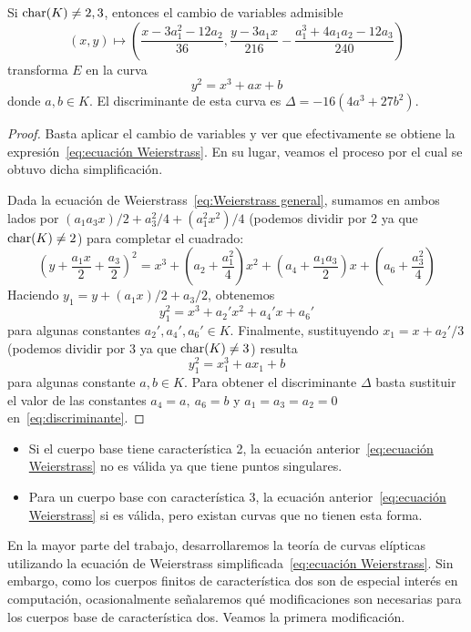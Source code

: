 \begin{lema}\label{lm: simplificación ecuación Weierstrass}
	Si $\operatorname{char}(K) \neq 2, 3$, entonces el cambio de variables admisible
	$$
	(x, y) \mapsto \left(\frac{x - 3 a_1^2 - 12 a_2}{36}, \frac{y - 3 a_1 x}{216} - \frac{a_1^3 + 4 a_1 a_2 - 12 a_3}{240}\right)
	$$
	transforma $E$ en la curva
	\begin{equation}\label{eq:ecuación Weierstrass}
		y^2 = x^3 + a x + b
	\end{equation}
	donde $a, b \in K$. El discriminante de esta curva es $\Delta = -16(4a^3 + 27b^2)$.
\end{lema}
\begin{proof}
Basta aplicar el cambio de variables y ver que efectivamente se obtiene la expresión~\eqref{eq:ecuación Weierstrass}. En su lugar, veamos el proceso por el cual se obtuvo dicha simplificación.

Dada la ecuación de Weierstrass~\eqref{eq:Weierstrass general}, sumamos en ambos lados por $(a_1 a_3 x)/2 + a_3^2/4 + (a_1^2 x^2)/4$ (podemos dividir por 2 ya que $\operatorname{char}(K) \neq 2$) para completar el cuadrado:
$$
\left(y + \frac{a_1 x}{2} + \frac{a_3}{2}\right)^2 = x^3 + \left(a_2 + \frac{a_1^2}{4}\right)x^2 + \left(a_4 + \frac{a_1 a_3}{2}\right)x + \left(a_6 + \frac{a_3^2}{4}\right)
$$
Haciendo $y_1 = y + (a_1 x)/2 + a_3/2$, obtenemos
$$
y_1^2 = x^3 + a_2' x^2 + a_4' x + a_6'
$$
para algunas constantes $a_2', a_4', a_6' \in K$. Finalmente, sustituyendo $x_1 = x + a_2'/3$ (podemos dividir por 3 ya que $\operatorname{char}(K) \neq 3$) resulta
$$
y_1^2 = x_1^3 + a x_1 + b
$$
para algunas constante $a, b \in K$. Para obtener el discriminante $\Delta$ basta sustituir el valor de las constantes $a_4 = a,\ a_6 = b$ y $a_1 = a_3 = a_2 = 0$ en~\eqref{eq:discriminante}.
\end{proof}
\begin{nota} \leavevmode
	\begin{itemize}
		\item Si el cuerpo base tiene característica 2, la ecuación anterior~\eqref{eq:ecuación Weierstrass} no es válida ya que tiene puntos singulares.
		\item Para un cuerpo base con característica 3, la ecuación anterior~\eqref{eq:ecuación Weierstrass} si es válida, pero existan curvas que no tienen esta forma.
	\end{itemize}
\end{nota}

En la mayor parte del trabajo, desarrollaremos la teoría de curvas elípticas utilizando la ecuación de Weierstrass simplificada~\eqref{eq:ecuación Weierstrass}. Sin embargo, como los cuerpos finitos de característica dos son de especial interés en computación, ocasionalmente señalaremos qué modificaciones son necesarias para los cuerpos base de característica dos. Veamos la primera modificación.

